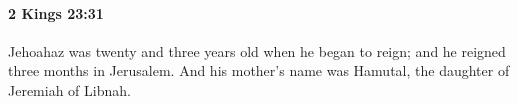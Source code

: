 
		\paragraph{2 Kings 23:31} %
			\label{2KINGS-23-31}

			Jehoahaz was twenty and three years old when he began to reign; and he reigned three months in Jerusalem. And his mother’s name was Hamutal, the daughter of Jeremiah of Libnah.


